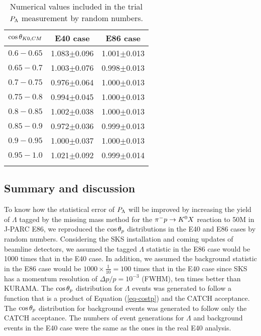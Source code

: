 
\begin{table}[!h] 
  \begin{center}
  \caption{Numerical values included in the trial $P_{\Lambda}$ measurement by random numbers.}
    \begin{tabular}{ccc}
    $\cos{\theta_{K0,CM}}$ & E40 case & E86 case  \\
    \midrule\midrule
    $0.6-0.65$ & 1.083$\pm$0.096 & 1.001$\pm$0.013  \\
    \midrule
    $0.65-0.7$ & 1.003$\pm$0.076 & 0.998$\pm$0.013 \\
    \midrule
    $0.7-0.75$ & 0.976$\pm$0.064 & 1.000$\pm$0.013 \\
    \midrule
    $0.75-0.8$ & 0.994$\pm$0.045 & 1.000$\pm$0.013 \\
    \midrule
    $0.8-0.85$ & 1.002$\pm$0.038 & 1.000$\pm$0.013 \\
    \midrule
    $0.85-0.9$ & 0.972$\pm$0.036 & 0.999$\pm$0.013 \\
    \midrule
    $0.9-0.95$ & 1.000$\pm$0.037 & 1.000$\pm$0.013 \\
    \midrule 
    $0.95-1.0$ & 1.021$\pm$0.092 & 0.999$\pm$0.014 \\
    \label{tab-randPl}
    \end{tabular}
  \end{center}
\end{table}


\subsection{Summary and discussion}
To know how the statistical error of $P_{\Lambda}$ will be improved by increasing the yield of $\Lambda$ tagged by the missing mass method for the $\pi^- p \to K^0 X$ reaction to 50M in J-PARC E86, we reproduced the $\cos{\theta_p}$ distributions in the E40 and E86 cases by random numbers. Considering the SKS installation and coming updates of beamline detectors, we assumed the tagged $\Lambda$ statistic in the E86 case would be 1000 times that in the E40 case. In addition, we assumed the background statistic in the E86 case would be $1000\times\frac{1}{10}=100$ times that in the E40 case since SKS has a momentum resolution of $\Delta p/p = 10^{-3}$ (FWHM), ten times better than KURAMA. The $\cos{\theta_p}$ distribution for $\Lambda$ events was generated to follow a function that is a product of Equation (\ref{eq-costp}) and the CATCH acceptance. The $\cos{\theta_p}$ distribution for background events was generated to follow only the CATCH acceptance. The numbers of event generations for $\Lambda$ and background events in the E40 case were the same as the ones in the real E40 analysis. 

